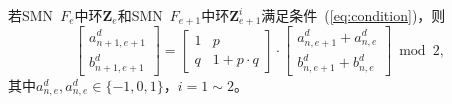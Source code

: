 \begin{Property}
若SMN\ $F_e$中环$\textbf{Z}_e$和SMN\ $F_{e+1}中环$$\textbf{Z}^i_{e+1}$满足条件~(\ref{eq:condition})，则
\begin{equation}
	\begin{bmatrix}
		a^d_{n+1,e+1}\\
		b^d_{n+1,e+1}
	\end{bmatrix}
	=
	\begin{bmatrix}
		1 & p    \\
		q & 1+p\cdot q
	\end{bmatrix}\cdot
	\begin{bmatrix}
		a^d_{n,e+1}+a^d_{n,e}  \\
		b^d_{n,e+1}+b^d_{n,e}
	\end{bmatrix} \bmod 2,
		\label{anebne}
\end{equation}
其中$a^d_{n,e}, a^d_{n,e}\in \{-1, 0, 1\}$，$i=1\sim 2$。
\end{Property}
